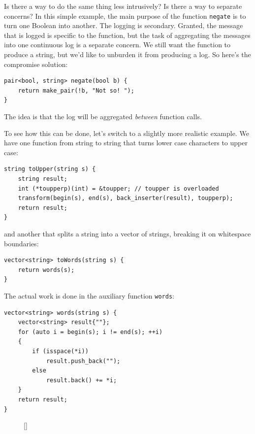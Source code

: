Is there a way to do the same thing less intrusively? Is there a way to
separate concerns? In this simple example, the main purpose of the
function \texttt{negate} is to turn one Boolean into another. The
logging is secondary. Granted, the message that is logged is specific to
the function, but the task of aggregating the messages into one
continuous log is a separate concern. We still want the function to
produce a string, but we'd like to unburden it from producing a log. So
here's the compromise solution:

\begin{verbatim}
pair<bool, string> negate(bool b) {
    return make_pair(!b, "Not so! ");
}
\end{verbatim}

The idea is that the log will be aggregated \emph{between} function
calls.

To see how this can be done, let's switch to a slightly more realistic
example. We have one function from string to string that turns lower
case characters to upper case:

\begin{verbatim}
string toUpper(string s) {
    string result;
    int (*toupperp)(int) = &toupper; // toupper is overloaded
    transform(begin(s), end(s), back_inserter(result), toupperp);
    return result;
}
\end{verbatim}

and another that splits a string into a vector of strings, breaking it
on whitespace boundaries:

\begin{verbatim}
vector<string> toWords(string s) {
    return words(s);
}
\end{verbatim}

The actual work is done in the auxiliary function \texttt{words}:

\begin{verbatim}
vector<string> words(string s) {
    vector<string> result{""};
    for (auto i = begin(s); i != end(s); ++i)
    {
        if (isspace(*i))
            result.push_back(""); 
        else
            result.back() += *i;
    }
    return result;
}
\end{verbatim}

\begin{figure}
\raisebox{0pt}[\dimexpr{}\baselineskip\relax]{
  }%
\end{figure}

